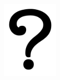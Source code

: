 \documentclass{beamer}
\begin{document}
	\begin{frame}[c]
		\begin{center}
			\begin{figure}
				\includegraphics[width=0.25\textwidth]{plots/questions.png}
			\end{figure}
		\end{center}
	\end{frame}
\end{document}
